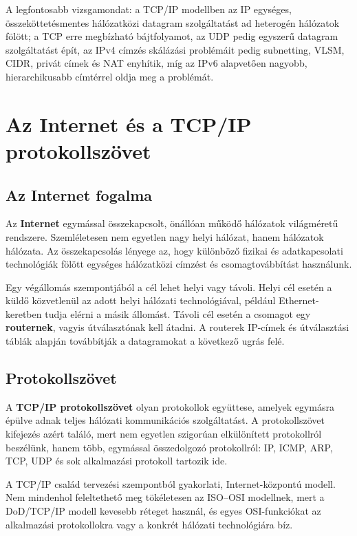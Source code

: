 A legfontosabb vizsgamondat: a TCP/IP modellben az IP egységes, összeköttetésmentes hálózatközi datagram szolgáltatást ad heterogén hálózatok fölött; a TCP erre megbízható bájtfolyamot, az UDP pedig egyszerű datagram szolgáltatást épít, az IPv4 címzés skálázási problémáit pedig subnetting, VLSM, CIDR, privát címek és NAT enyhítik, míg az IPv6 alapvetően nagyobb, hierarchikusabb címtérrel oldja meg a problémát.

\section{Az Internet és a TCP/IP protokollszövet}

\subsection{Az Internet fogalma}

Az \textbf{Internet} egymással összekapcsolt, önállóan működő hálózatok világméretű rendszere. Szemléletesen nem egyetlen nagy helyi hálózat, hanem hálózatok hálózata. Az összekapcsolás lényege az, hogy különböző fizikai és adatkapcsolati technológiák fölött egységes hálózatközi címzést és csomagtovábbítást használunk.

Egy végállomás szempontjából a cél lehet helyi vagy távoli. Helyi cél esetén a küldő közvetlenül az adott helyi hálózati technológiával, például Ethernet-keretben tudja elérni a másik állomást. Távoli cél esetén a csomagot egy \textbf{routernek}, vagyis útválasztónak kell átadni. A routerek IP-címek és útválasztási táblák alapján továbbítják a datagramokat a következő ugrás felé.

\subsection{Protokollszövet}

A \textbf{TCP/IP protokollszövet} olyan protokollok együttese, amelyek egymásra épülve adnak teljes hálózati kommunikációs szolgáltatást. A protokollszövet kifejezés azért találó, mert nem egyetlen szigorúan elkülönített protokollról beszélünk, hanem több, egymással összedolgozó protokollról: IP, ICMP, ARP, TCP, UDP és sok alkalmazási protokoll tartozik ide.

A TCP/IP család tervezési szempontból gyakorlati, Internet-központú modell. Nem mindenhol feleltethető meg tökéletesen az ISO--OSI modellnek, mert a DoD/TCP/IP modell kevesebb réteget használ, és egyes OSI-funkciókat az alkalmazási protokollokra vagy a konkrét hálózati technológiára bíz.

